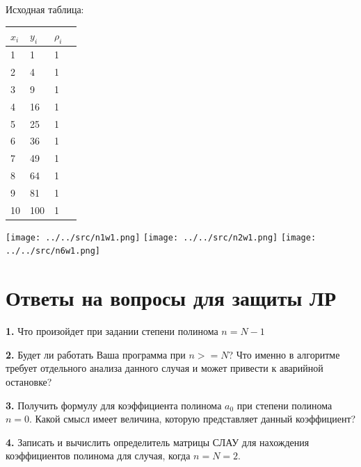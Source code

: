 \documentclass[a4paper,12pt]{article}
\begin{document}
\begin{center}
	Исходная таблица: 
	
	\begin{center}
		\begin{tabular}{ | l | l | l | p{1cm} |}
			\hline
			$x_{i}$ & $y_{i}$ & $\rho_{i}$ \\ \hline
			1 & 1 & 1 \\ \hline
			2 & 4 & 1 \\ \hline
			3 & 9 & 1 \\ \hline
			4 & 16 & 1 \\ \hline
			5 & 25 & 1 \\ \hline
			6 & 36 & 1 \\ \hline
			7 & 49 & 1 \\ \hline
			8 & 64 & 1 \\ \hline
			9 & 81 & 1 \\ \hline					
			10 & 100 & 1 \\
			\hline
		\end{tabular}
	\end{center}
	
	\texttt{[image: ../../src/n1w1.png]} \newline
	\texttt{[image: ../../src/n2w1.png]} \newline
	\texttt{[image: ../../src/n6w1.png]} \newline
\end{center}

\clearpage
\section{Ответы на вопросы для защиты ЛР}
\noindent\textbf{1.} Что произойдет при задании  степени полинома $n = N-1$\newline

\noindent\textbf{2.} Будет ли работать Ваша программа при $ n >= N$? Что именно в алгоритме требует отдельного анализа данного случая и может привести к аварийной остановке?\newline

\noindent\textbf{3.} Получить формулу для коэффициента  полинома $a_{0}$  при степени полинома $n = 0$. Какой смысл имеет  величина, которую представляет данный коэффициент?\newline

\noindent\textbf{4.} Записать и вычислить определитель матрицы СЛАУ для нахождения коэффициентов полинома для случая, когда  $n=N=2$. \newline
\end{document}
